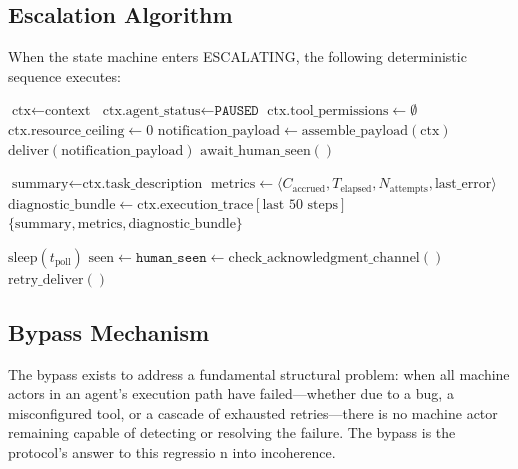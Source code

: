 \bigskip

\subsection{Escalation Algorithm}

When the state machine enters ESCALATING, the following deterministic sequence executes:

\begin{algorithm}[htbp]
\caption{Escalation Sequence}
\begin{algorithmic}[1]
  \State $\text{ctx} \leftarrow \text{context}$
  \State $\text{ctx.agent\_status} \leftarrow \texttt{PAUSED}$
  \State $\text{ctx.tool\_permissions} \leftarrow \emptyset$ 
  \State $\text{ctx.resource\_ceiling} \leftarrow 0$ 
  \State $\text{notification\_payload} \leftarrow \text{assemble\_payload}(\text{ctx})$
  \State $\text{deliver}(\text{notification\_payload})$ 
  \State $\text{await\_human\_seen}()$
\EndFunction

  \State $\text{summary} \leftarrow \text{ctx.task\_description}$
  \State $\text{metrics} \leftarrow \langle C_\text{accrued}, T_\text{elapsed}, N_\text{attempts}, \text{last\_error} \rangle$
  \State $\text{diagnostic\_bundle} \leftarrow \text{ctx.execution\_trace}[\text{last } 50 \text{ steps}]$
  \State \Return $\{\text{summary}, \text{metrics}, \text{diagnostic\_bundle}\}$
\EndFunction

  \Repeat
    \State $\text{sleep}(t_\text{poll})$
    \State $\text{seen} \leftarrow \texttt{human\_seen} \gets \text{check\_acknowledgment\_channel}()$
    \State $\text{retry\_deliver}()$ 
  \EndIf
\EndFunction
\end{algorithmic}
\end{algorithm}

\bigskip

\subsection{Bypass Mechanism}

The bypass exists to address a fundamental structural problem: when all machine actors in an agent's execution path have failed—whether due to a bug, a misconfigured tool, or a cascade of exhausted retries—there is no machine actor remaining capable of detecting or resolving the failure. The bypass is the protocol's answer to this regressio n into incoherence.

